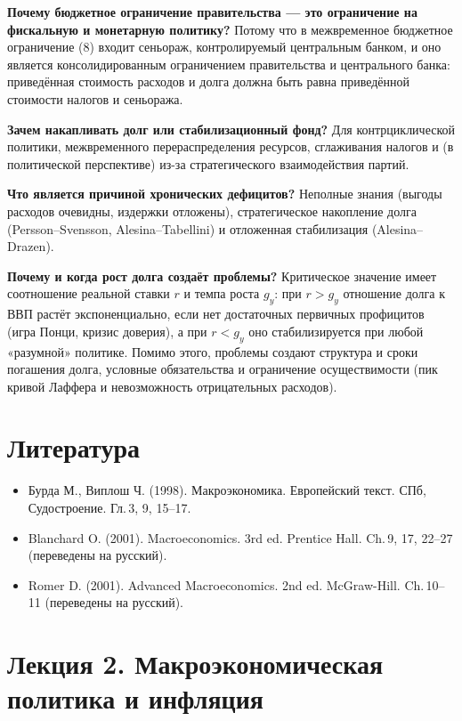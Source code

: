\documentclass[11pt,a4paper]{article}
\begin{document}
\textbf{Почему бюджетное ограничение правительства --- это ограничение на фискальную и монетарную политику?} Потому что в межвременное бюджетное ограничение (8) входит сеньораж, контролируемый центральным банком, и оно является консолидированным ограничением правительства и центрального банка: приведённая стоимость расходов и долга должна быть равна приведённой стоимости налогов и сеньоража.

\textbf{Зачем накапливать долг или стабилизационный фонд?} Для контрциклической политики, межвременного перераспределения ресурсов, сглаживания налогов и (в политической перспективе) из-за стратегического взаимодействия партий.

\textbf{Что является причиной хронических дефицитов?} Неполные знания (выгоды расходов очевидны, издержки отложены), стратегическое накопление долга (Persson--Svensson, Alesina--Tabellini) и отложенная стабилизация (Alesina--Drazen).

\textbf{Почему и когда рост долга создаёт проблемы?} Критическое значение имеет соотношение реальной ставки $r$ и темпа роста $g_y$: при $r>g_y$ отношение долга к ВВП растёт экспоненциально, если нет достаточных первичных профицитов (игра Понци, кризис доверия), а при $r<g_y$ оно стабилизируется при любой «разумной» политике. Помимо этого, проблемы создают структура и сроки погашения долга, условные обязательства и ограничение осуществимости (пик кривой Лаффера и невозможность отрицательных расходов).

\section*{Литература}

\begin{itemize}[leftmargin=1.5em]
\item Бурда М., Виплош Ч. (1998). Макроэкономика. Европейский текст. СПб, Судостроение. Гл.\,3, 9, 15--17.
\item Blanchard O. (2001). Macroeconomics. 3rd ed. Prentice Hall. Ch.\,9, 17, 22--27 (переведены на русский).
\item Romer D. (2001). Advanced Macroeconomics. 2nd ed. McGraw-Hill. Ch.\,10--11 (переведены на русский).
\end{itemize}

\newpage
\section{Лекция 2. Макроэкономическая политика и инфляция}
\end{document}

